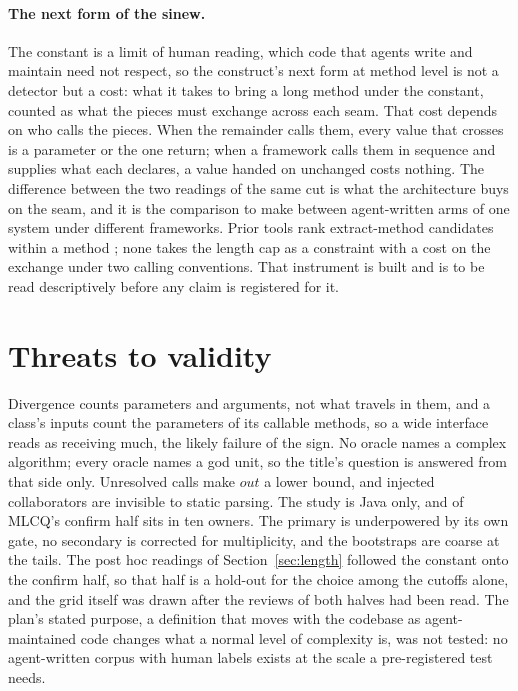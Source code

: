 \documentclass[11pt,a4paper]{article}
\begin{document}
\paragraph{The next form of the sinew.} The constant is a limit of human
reading, which code that agents write and maintain need not respect, so
the construct's next form at method level is not a detector but a cost:
what it takes to bring a long method under the constant, counted as what
the pieces must exchange across each seam. That cost depends on who calls the pieces. When the remainder calls
them, every value that crosses is a parameter or the one return; when a
framework calls them in sequence and supplies what each declares, a value
handed on unchanged costs nothing. The difference between the two readings
of the same cut is what the architecture buys on the seam, and it is the
comparison to make between agent-written arms of one system under
different frameworks. Prior tools rank extract-method candidates within a
method \cite{tsantalis2011, haas2016}; none takes the length cap as a
constraint with a cost on the exchange under two calling conventions. That
instrument is built and is to be read descriptively before any claim is
registered for it.

\section{Threats to validity}
\label{sec:threats}

Divergence counts parameters and arguments, not what travels in them, and
a class's inputs count the parameters of its callable methods, so a wide
interface reads as receiving much, the likely failure of the sign. No
oracle names a complex algorithm; every oracle names a god unit, so the
title's question is answered from that side only. Unresolved calls make $\mathit{out}$ a lower bound, and injected
collaborators are invisible to static parsing. The study is Java only, and
\mlcqOwnerTopShare{} of MLCQ's confirm half sits in ten owners. The primary
is underpowered by its own gate, no secondary is corrected for
multiplicity, and the bootstraps are coarse at the tails. The post hoc readings of Section~\ref{sec:length} followed the constant
onto the confirm half, so that half is a hold-out for the choice among the
\lwNlocGridCount{} cutoffs alone, and the grid itself was drawn after the
reviews of both halves had been read. The plan's stated purpose, a definition
that moves with the codebase as agent-maintained code changes what a normal
level of complexity is, was not tested: no agent-written corpus with human
labels exists at the scale a pre-registered test needs.
\end{document}
